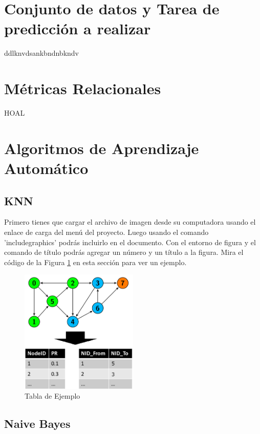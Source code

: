 \documentclass[12pt]{article}
\begin{document}
\section{Conjunto de datos y Tarea de predicción a realizar}
ddlknvdsankbndnbkndv

\section{Métricas Relacionales}
HOAL

\section{Algoritmos de Aprendizaje Automático}

\subsection{KNN}

Primero tienes que cargar el archivo de imagen desde su computadora usando el enlace de carga del menú del proyecto. Luego usando el comando 'includegraphics' podrás incluirlo en el documento. Con el entorno de figura y el comando de título podrás agregar un número y un título a la figura. Mira el código de la Figura \ref{fig:tablaEj} en esta sección para ver un ejemplo.


\begin{figure} %
    \centering
    \includegraphics[width=0.5\textwidth]{./ImagenesMemoria/TablaEjemplo}
    \caption{\label{fig:tablaEj}Tabla de Ejemplo}
\end{figure}


\subsection{Naive Bayes}
% 
% 
% 
\end{document}
